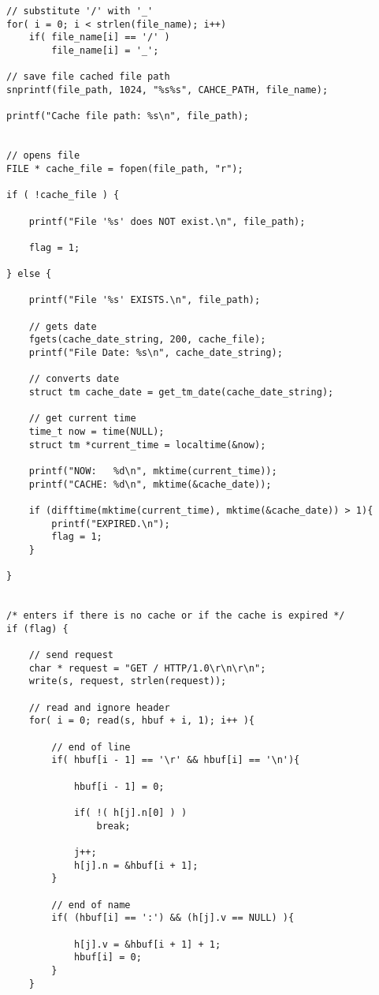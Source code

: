 \begin{lstlisting}
// substitute '/' with '_'
for( i = 0; i < strlen(file_name); i++)
    if( file_name[i] == '/' )
        file_name[i] = '_';

// save file cached file path
snprintf(file_path, 1024, "%s%s", CAHCE_PATH, file_name);

printf("Cache file path: %s\n", file_path);


// opens file
FILE * cache_file = fopen(file_path, "r");

if ( !cache_file ) {
    
    printf("File '%s' does NOT exist.\n", file_path);

    flag = 1;

} else {

    printf("File '%s' EXISTS.\n", file_path);

    // gets date
    fgets(cache_date_string, 200, cache_file);
    printf("File Date: %s\n", cache_date_string);

    // converts date
    struct tm cache_date = get_tm_date(cache_date_string);

    // get current time
    time_t now = time(NULL);
    struct tm *current_time = localtime(&now);

    printf("NOW:   %d\n", mktime(current_time));
    printf("CACHE: %d\n", mktime(&cache_date));

    if (difftime(mktime(current_time), mktime(&cache_date)) > 1){
        printf("EXPIRED.\n");
        flag = 1;
    }

} 


/* enters if there is no cache or if the cache is expired */
if (flag) {

    // send request
    char * request = "GET / HTTP/1.0\r\n\r\n";
    write(s, request, strlen(request));

    // read and ignore header
    for( i = 0; read(s, hbuf + i, 1); i++ ){

        // end of line
        if( hbuf[i - 1] == '\r' && hbuf[i] == '\n'){
            
            hbuf[i - 1] = 0;
        
            if( !( h[j].n[0] ) )
                break;
            
            j++;
            h[j].n = &hbuf[i + 1];
        }

        // end of name
        if( (hbuf[i] == ':') && (h[j].v == NULL) ){

            h[j].v = &hbuf[i + 1] + 1;
            hbuf[i] = 0;
        }
    }



\end{lstlisting}
